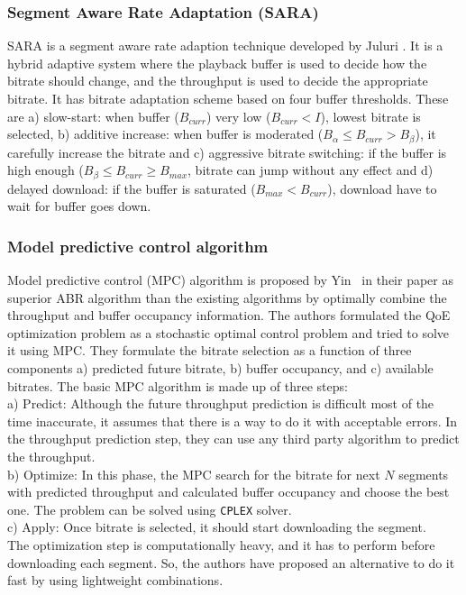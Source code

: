 \subsubsection{Segment Aware Rate Adaptation (SARA)}
SARA\cite{7247436} is a segment aware rate adaption technique developed by Juluri \etal. It is a hybrid adaptive system where the playback buffer is used to decide how the bitrate should change, and the throughput is used to decide the appropriate bitrate. It has bitrate adaptation scheme based on four buffer thresholds. These are a) slow-start: when buffer ($B_{curr}$) very low ($B_{curr}<I$), lowest bitrate is selected, b) additive increase: when buffer is moderated ($B_{\alpha} \le B_{curr} > B_{\beta}$), it carefully increase the bitrate and c) aggressive bitrate switching: if the buffer is high enough ($B_{\beta} \le B_{curr} \ge B_{max}$, bitrate can jump without any effect and d) delayed download: if the buffer is saturated ($B_{max} < B_{curr}$), download have to wait for buffer goes down.

\subsubsection{Model predictive control algorithm}
Model predictive control (MPC) algorithm is proposed by Yin \etal\ in their paper \cite{yin2015control,10.1145/2670518.2673877} as superior ABR algorithm than the existing algorithms by optimally combine the throughput and buffer occupancy information. The authors formulated the QoE optimization problem as a stochastic optimal control problem and tried to solve it using MPC. They formulate the bitrate selection as a function of three components a) predicted future bitrate, b) buffer occupancy, and c) available bitrates. The basic MPC algorithm is made up of three steps: \\
a) Predict: Although the future throughput prediction is difficult most of the time inaccurate, it assumes that there is a way to do it with acceptable errors. In the throughput prediction step, they can use any third party algorithm to predict the throughput.\\
b) Optimize: In this phase, the MPC search for the bitrate for next $N$ segments with predicted throughput and calculated buffer occupancy and choose the best one. The problem can be solved using {\tt CPLEX} solver.\\
c) Apply: Once bitrate is selected, it should start downloading the segment.\\
The optimization step is computationally heavy, and it has to perform before downloading each segment. So, the authors have proposed an alternative to do it fast by using lightweight combinations.


